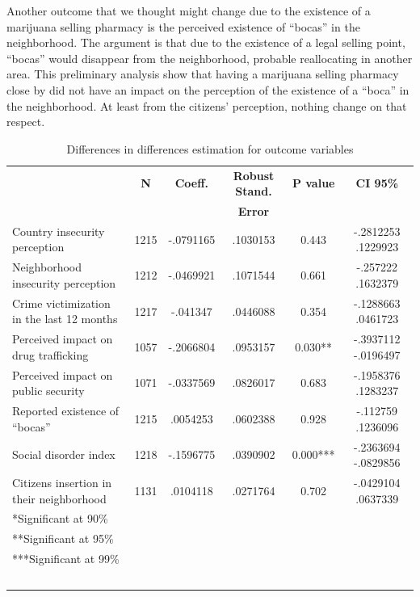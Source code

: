 \documentclass[11pt]{article}
\begin{document}
Another outcome that we thought might change due to the existence of a marijuana selling pharmacy is the perceived existence of ``bocas'' in the neighborhood. The argument is that due to the existence of a legal selling point, ``bocas'' would disappear from the neighborhood, probable reallocating in another area. This preliminary analysis show that having a marijuana selling pharmacy close by did not have an impact on the perception of the existence of a ``boca'' in the neighborhood. At least from the citizens' perception, nothing change on that respect.

\begin{table}[H]
        \centering
        \footnotesize
        \caption{Differences in differences estimation for outcome variables}
    \label{tab:regtab}
    \begin{tabular}{lccccc}
 & \textbf{N} & \textbf{Coeff.}	&	\textbf{Robust Stand.}	&	\textbf{P value}	&	\textbf{CI 95\% } 		\\	
 &  & 	&	\textbf{Error}	&		&		\\	\hline
Country insecurity  perception	&	1215	&	-.0791165	&	.1030153	&	0.443	&	-.2812253    	.1229923	\\	
Neighborhood insecurity perception	&	1212	&	-.0469921	&	.1071544	&	0.661	&	-.257222    	.1632379	\\
Crime victimization in the last 12 months	&	1217	&	-.041347	&	.0446088	&	0.354	&	-.1288663  	 .0461723	\\	
Perceived impact on drug trafficking &	1057	&	-.2066804 	&	.0953157	&	0.030**	&	 -.3937112  	 -.0196497	\\	
Perceived impact on public security	&	1071	&	-.0337569 	&	.0826017 	&	0.683	&	-.1958376    	.1283237	\\
Reported existence of ``bocas''	&	1215	&	.0054253	&	.0602388	&	 0.928	&	-.112759 	.1236096	\\	
Social disorder index	&	1218	&	-.1596775 	&	.0390902 	&	0.000***	&	-.2363694 	-.0829856	\\	
Citizens insertion in their neighborhood	&	1131	&	.0104118	&	.0271764	&	0.702	&	-.0429104   	 .0637339	\\	\hline
*Significant at 90\%\\
**Significant at 95\%\\
***Significant at 99\% \\~\\
        \end{tabular}
        \end{table}
\end{document}
